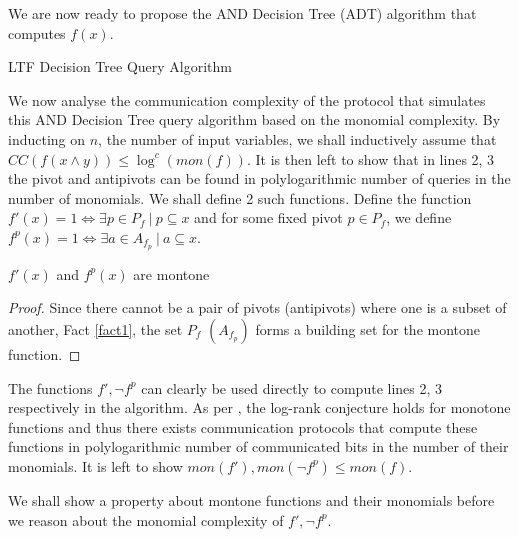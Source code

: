 We are now ready to propose the AND Decision Tree (ADT) algorithm that computes $f(x)$. 

\begin{algorithm}[H]\label{alg1}
\caption{LTF Decision Tree Query Algorithm}
\end{algorithm}


We now analyse the communication complexity of the protocol that simulates this AND Decision Tree query algorithm based on the monomial complexity. By inducting on $n$, the number of input variables, we shall inductively assume that $CC(f(x \wedge y)) \leq \log^c(mon(f))$. It is then left to show that in lines 2, 3 the pivot and antipivots can be found in polylogarithmic number of queries in the number of monomials. We shall define 2 such functions. Define the function $f'(x) = 1 \iff \exists p \in P_f \ | \ p \subseteq x$ and for some fixed pivot $p \in P_f$, we define $f^p(x) = 1 \iff \exists a \in A_{f_p} \ | \ a \subseteq x$.  


\begin{proposition}\label{prop1}
	$f'(x)$ and $f^p(x)$ are montone 
	\begin{proof}
		Since there cannot be a pair of pivots (antipivots) where one is a subset of another, Fact \ref{fact1}, the set $P_f$ $(A_{f_p})$ forms a building set for the montone function. 
	\end{proof}
\end{proposition}

The functions $f', \neg f^p$ can clearly be used directly to compute lines 2, 3 respectively in the algorithm. As per \cite{Buhrman1999,Lovasz1993}, the log-rank conjecture holds for monotone functions and thus there exists communication protocols that compute these functions in polylogarithmic number of communicated bits in the number of their monomials. It is left to show $mon(f'), mon( \neg f^p) \leq mon(f)$.

We shall show a property about montone functions and their monomials before we reason about the monomial complexity of $f', \neg f^p$.

